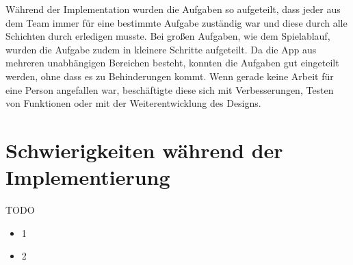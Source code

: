 Während der Implementation wurden die Aufgaben so aufgeteilt, dass jeder aus dem Team immer für eine bestimmte Aufgabe zuständig war und diese durch alle Schichten durch erledigen musste. Bei großen Aufgaben, wie dem Spielablauf, wurden die Aufgabe zudem in kleinere Schritte aufgeteilt. Da die App aus mehreren unabhängigen Bereichen besteht, konnten die Aufgaben gut eingeteilt werden, ohne dass es zu Behinderungen kommt. Wenn gerade keine Arbeit für eine Person angefallen war, beschäftigte diese sich mit Verbesserungen, Testen von Funktionen oder mit der Weiterentwicklung des Designs.

\section{Schwierigkeiten während der Implementierung}
\label{sec:implementierung:schwierigkeiten}	

TODO

\begin{itemize} 
\item 1
\item 2
\end{itemize}




